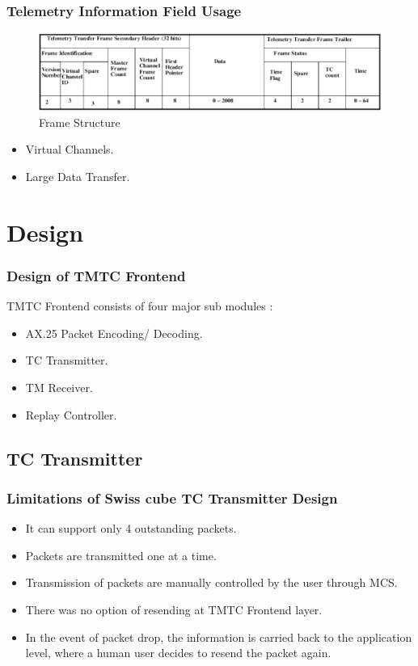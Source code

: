 \documentclass{beamer}
\begin{document}
\begin{frame}
\frametitle{Telemetry Information Field Usage}
\begin{figure}
\includegraphics[scale = 0.35 ]{ax25telemetry.pdf}
\caption{Frame Structure}
\label{fig1:ax25telemetry}
\end{figure}
\begin{itemize}
\item Virtual Channels.
\item Large Data Transfer.
\end{itemize}
\end{frame}


\section{Design}

\begin{frame}
\frametitle{Design of TMTC Frontend}
TMTC Frontend consists of four major sub modules :
\begin{itemize}
\item AX.25 Packet Encoding/ Decoding.
\item TC Transmitter.
\item TM Receiver.
\item Replay Controller.
\end{itemize}
\end{frame}
\subsection{TC Transmitter}
\begin{frame}
\frametitle{Limitations of Swiss cube TC Transmitter Design }
\begin{itemize}
\item It can support only 4 outstanding packets.
\item Packets are transmitted one at a time.
\item Transmission of packets are manually controlled by the user through MCS.
\item There was no option of resending at TMTC Frontend layer.
\item In the event of packet drop, the information is carried back to the application
level, where a human user decides to resend the packet again.

\end{itemize}
\end{frame}
\end{document}
